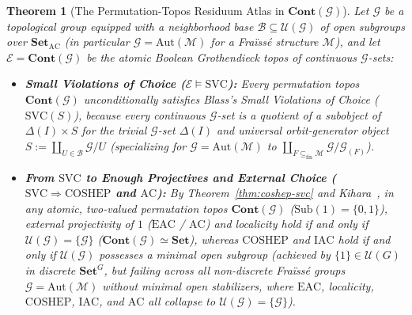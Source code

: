 \documentclass[10pt,twoside,openright]{book}
\theoremstyle{crmplain}
\newtheorem{theorem}{Theorem}[section]
\theoremstyle{crmdef}
\theoremstyle{crmremark}
\newcommand{\lean}[1]{\ignorespaces}
\newcommand{\leanwitness}{\ignorespaces}
\begin{document}
\begin{theorem}[The Permutation-Topos Residuum Atlas in $\mathbf{Cont}(\mathcal{G})$]\label{thm:permutation-topos}%
\lean{HomotopyCRM.pointwiseStabilizer_lt_top_of_nonempty, HomotopyCRM.isEmpty_globalSections_quotient_of_lt_top, HomotopyCRM.open_normal_eq_top, HomotopyCRM.open_finiteIndex_eq_top, HomotopyCRM.instModuleZMod2EvenFinset, HomotopyCRM.instAddTorsorEvenFinsetTOdd, HomotopyCRM.isEmpty_t_odd_sections_empty, HomotopyCRM.nonempty_t_odd_sections_singleton, HomotopyCRM.atomSection_vsub_card_and_ne_zero}%
\leanwitness%
%
Let $\mathcal{G}$ be a topological group equipped with a neighborhood base $\mathcal{B} \subseteq \mathcal{U}(\mathcal{G})$ of open subgroups over $\mathbf{Set}_{\mathrm{AC}}$ (in particular $\mathcal{G} = \mathrm{Aut}(\mathcal{M})$ for a Fra\"iss\'e structure $\mathcal{M}$), and let $\mathcal{E} = \mathbf{Cont}(\mathcal{G})$ be the atomic Boolean Grothendieck topos of continuous $\mathcal{G}$-sets:

\begin{itemize}[leftmargin=1.5em]

  \item \textbf{Small Violations of Choice ($\mathcal{E} \models \mathrm{SVC}$):} Every permutation topos $\mathbf{Cont}(\mathcal{G})$ unconditionally satisfies Blass's Small Violations of Choice ($\mathrm{SVC}(S)$), because every continuous $\mathcal{G}$-set is a quotient of a subobject of $\Delta(I) \times S$ for the trivial $\mathcal{G}$-set $\Delta(I)$ and universal orbit-generator object $S := \coprod_{U \in \mathcal{B}} \mathcal{G}/U$ (specializing for $\mathcal{G} = \mathrm{Aut}(\mathcal{M})$ to $\coprod_{F \subseteq_{\mathrm{fin}} \mathcal{M}} \mathcal{G}/\mathcal{G}_{(F)}$).

  \item \textbf{From $\mathrm{SVC}$ to Enough Projectives and External Choice ($\mathrm{SVC} \Rightarrow \mathrm{COSHEP}$ and $\mathrm{AC}$):} By Theorem~\ref{thm:coshep-svc} and Kihara~\cite[Theorems~6.2 and~6.19]{Kihara26}, in any atomic, two-valued permutation topos $\mathbf{Cont}(\mathcal{G})$ ($\mathrm{Sub}(1) = \{0, 1\}$), external projectivity of $1$ ($\mathrm{EAC}$ / $\mathrm{AC}$) and localicity hold if and only if $\mathcal{U}(\mathcal{G}) = \{\mathcal{G}\}$ ($\mathbf{Cont}(\mathcal{G}) \simeq \mathbf{Set}$), whereas $\mathrm{COSHEP}$ and $\mathrm{IAC}$ hold if and only if $\mathcal{U}(\mathcal{G})$ possesses a minimal open subgroup (achieved by $\{1\} \in \mathcal{U}(G)$ in discrete $\mathbf{Set}^G$, but failing across all non-discrete Fra\"iss\'e groups $\mathcal{G} = \mathrm{Aut}(\mathcal{M})$ without minimal open stabilizers, where $\mathrm{EAC}$, localicity, $\mathrm{COSHEP}$, $\mathrm{IAC}$, and $\mathrm{AC}$ all collapse to $\mathcal{U}(\mathcal{G}) = \{\mathcal{G}\}$).


\end{itemize}
\end{theorem}
\end{document}
